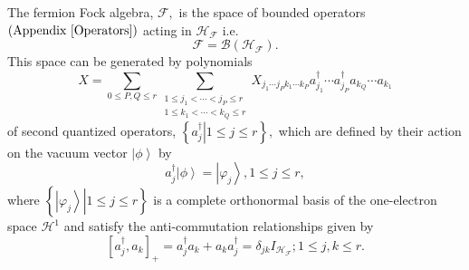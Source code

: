 \documentclass[aps,preprint]{revtex4}%
\begin{document}
The fermion Fock algebra, $\mathcal{F},$ is the space of bounded operators
$\left(  \text{Appendix \ref{Operators}}\right)  $ acting in $\mathcal{H}%
_{\mathcal{F}}$ i.e.
\begin{equation}
\mathcal{F}=\mathcal{B}\left(  \mathcal{H}_{\mathcal{F}}\right)  .
\end{equation}
This space can be generated by polynomials
\begin{equation}
X=\sum_{0\leq P,Q\leq r}\sum_{\substack{1\leq j_{1}<\cdots<j_{P}\leq r\\1\leq
k_{1}<\cdots<k_{Q}\leq r}}X_{j_{1}\cdots j_{P}k_{1}\cdots k_{P}}a_{j_{1}%
}^{\dagger}\cdots a_{j_{P}}^{\dagger}a_{k_{Q}}\cdots a_{k_{1}}%
\end{equation}
of second quantized operators, $\left\{  \left.  a_{j}^{\dagger}\right\vert
1\leq j\leq r\right\}  ,$ which are defined by their action on the vacuum
vector $\left\vert \phi\right\rangle $ by
\begin{equation}
a_{j}^{\dagger}\left\vert \phi\right\rangle =\left\vert \varphi_{j}%
\right\rangle ,1\leq j\leq r,
\end{equation}
where $\left\{  \left.  \left\vert \varphi_{j}\right\rangle \right\vert 1\leq
j\leq r\right\}  $ is a complete orthonormal basis of the one-electron space
$\mathcal{H}^{1}$ and satisfy the anti-commutation relationships given by
\begin{equation}
\left[  a_{j}^{\dagger},a_{k}\right]  _{+}=a_{j}^{\dagger}a_{k}+a_{k}%
a_{j}^{\dagger}=\delta_{jk}I_{\mathcal{H}_{\mathcal{F}}};1\leq j,k\leq r.
\label{CAR}%
\end{equation}
\end{document}
